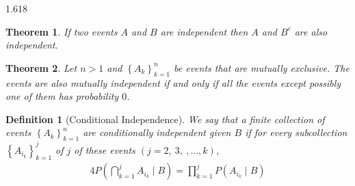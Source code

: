 \documentclass[11pt, oneside]{book}   	%
\newtheorem{definition}{Definition}[chapter]
\newtheorem{theorem}{Theorem}[chapter]
\newcommand{\set}[1]{\left\{#1\right\}}
\begin{document}
\begin{spacing}{1.618}
		\begin{theorem}
			If two events $A$ and $B$ are independent then $A$ and $B^c$ are also independent. 
		\end{theorem}

		\begin{theorem}
			Let $n>1$ and $\set{A_k}_{k=1}^n$ be events that are mutually exclusive. The events are also mutually independent if and only if all the events except possibly one of them has probability $0$. 
		\end{theorem}
		
	
		
		\begin{definition}[Conditional Independence]
			We say that a finite collection of events $\set{A_k}_{k=1}^n$ are conditionally independent given $B$ if for every subcollection $\set{A_{i_k}}_{k=1}^j$ of $j$ of these events $(j=2,~3,~, \dots, k)$,
			\begin{alignat}{4}
				P\left(\bigcap_{k=1}^j A_{i_k}\mid B\right) = \prod_{k=1}^j P(A_{i_k}\mid B)
			\end{alignat}
		\end{definition}
		

\end{spacing}
\end{document}
